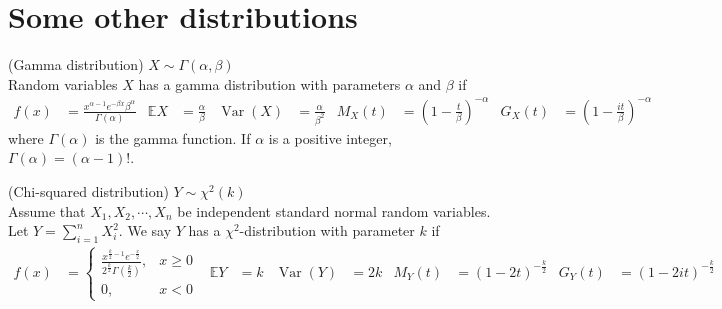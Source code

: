 \documentclass{huhtakm-template-book}
\newcommand{\expect}{\mathbb{E}}
\DeclareMathOperator{\Var}{Var}
\begin{document}
\chapter{Some other distributions}
\begin{eg}(Gamma distribution) $X\sim\Gamma(\alpha,\beta)$\\
    Random variables $X$ has a gamma distribution with parameters $\alpha$ and $\beta$ if
    \begin{align*}
        f(x)&=\frac{x^{\alpha-1}e^{-\beta x}\beta^{\alpha}}{\Gamma(\alpha)} & \expect X&=\frac{\alpha}{\beta} & \Var(X)&=\frac{\alpha}{\beta^{2}} & M_{X}(t)&=\left(1-\frac{t}{\beta}\right)^{-\alpha} & G_{X}(t)&=\left(1-\frac{it}{\beta}\right)^{-\alpha}
    \end{align*}
    where $\Gamma(\alpha)$ is the gamma function. If $\alpha$ is a positive integer, $\Gamma(\alpha)=(\alpha-1)!$.
\end{eg}
\begin{eg}(Chi-squared distribution) $Y\sim\chi^{2}(k)$\\
    Assume that $X_{1},X_{2},\cdots,X_{n}$ be independent standard normal random variables. Let $Y=\sum_{i=1}^{n}X_{i}^{2}$. We say $Y$ has a $\chi^{2}$-distribution with parameter $k$ if
    \begin{align*}
        f(x)&=\begin{cases}
            \frac{x^{\frac{k}{2}-1}e^{-\frac{x}{2}}}{2^{\frac{k}{2}}\Gamma\left(\frac{k}{2}\right)}, &x\geq 0\\
            0, &x<0
        \end{cases} & \expect Y&=k & \Var(Y)&=2k & M_{Y}(t)&=(1-2t)^{-\frac{k}{2}} & G_{Y}(t)&=(1-2it)^{-\frac{k}{2}}
    \end{align*}
\end{eg}
\end{document}
